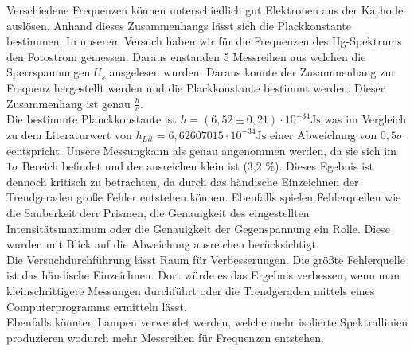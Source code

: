 Verschiedene Frequenzen können unterschiedlich gut Elektronen aus der Kathode
auslösen. Anhand dieses Zusammenhangs lässt sich die Plackkonstante bestimmen.
In unserem Versuch haben wir für die Frequenzen des Hg-Spektrums den Fotostrom
gemessen. Daraus enstanden 5 Messreihen aus welchen die Sperrspannungen $U_s$
ausgelesen wurden. Daraus konnte der Zusammenhang zur Frequenz hergestellt werden
und die Plackkonstante bestimmt werden. Dieser Zusammenhang ist genau $\tfrac{h}{e}$.\\
\smallbreak
Die bestimmte Planckkonstante ist $ h= (6,52 \pm 0,21 )\cdot 10^{-34} \text{Js}$ was im Vergleich
zu dem Literaturwert von $h_{Lit} =6,626 070 15 \cdot 10^{-34} \text{Js}$ einer Abweichung von
$0,5 \sigma$ eentspricht. Unsere Messungkann  als genau angenommen werden,
da sie sich im $1 \sigma$ Bereich befindet und der ausreichen klein ist (3,2 \%).
Dieses Egebnis ist dennoch kritisch zu betrachten, da durch das händische Einzeichnen der
Trendgeraden große Fehler entstehen können. Ebenfalls spielen Fehlerquellen
wie die Sauberkeit derr Prismen, die Genauigkeit des eingestellten Intensitätsmaximum oder
die Genauigkeit der Gegenspannung ein Rolle. Diese wurden mit Blick auf die Abweichung
ausreichen berücksichtigt. \\
\smallbreak
Die Versuchdurchführung lässt Raum für Verbesserungen. Die größte Fehlerquelle ist
das händische Einzeichnen. Dort würde es das Ergebnis verbessen, wenn man kleinschrittigere Messungen
durchführt oder die Trendgeraden mittels eines Computerprogramms ermitteln lässt. \\
Ebenfalls könnten Lampen verwendet werden, welche mehr isolierte Spektrallinien produzieren
wodurch mehr Messreihen für Frequenzen entstehen.
